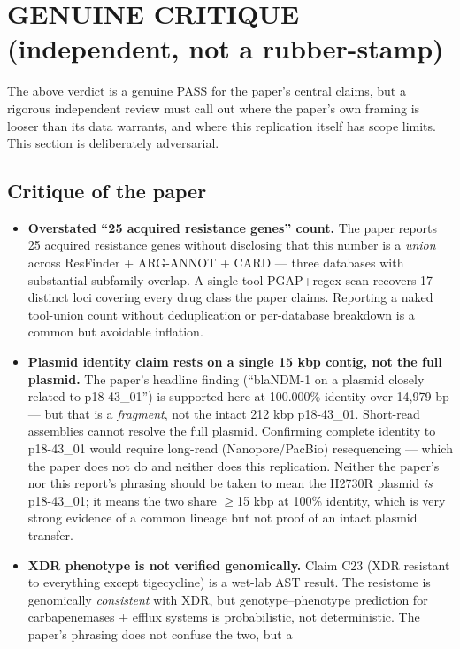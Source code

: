 \documentclass[11pt]{article}
\begin{document}
\section{GENUINE CRITIQUE (independent, not a rubber-stamp)}

The above verdict is a genuine PASS for the paper's central claims, but a rigorous independent
review must call out where the paper's own framing is looser than its data warrants, and where
this replication itself has scope limits. This section is deliberately adversarial.

\subsection*{Critique of the paper}
\begin{itemize}
\item \textbf{Overstated ``25 acquired resistance genes'' count.} The paper reports 25 acquired
      resistance genes without disclosing that this number is a \emph{union} across ResFinder +
      ARG-ANNOT + CARD --- three databases with substantial subfamily overlap. A single-tool
      PGAP+regex scan recovers 17 distinct loci covering every drug class the paper claims.
      Reporting a naked tool-union count without deduplication or per-database breakdown is a
      common but avoidable inflation.
\item \textbf{Plasmid identity claim rests on a single 15 kbp contig, not the full plasmid.}
      The paper's headline finding (``blaNDM-1 on a plasmid closely related to p18-43\_01'') is
      supported here at 100.000\% identity over 14{,}979 bp --- but that is a \emph{fragment}, not
      the intact 212 kbp p18-43\_01. Short-read assemblies cannot resolve the full plasmid.
      Confirming complete identity to p18-43\_01 would require long-read (Nanopore/PacBio)
      resequencing --- which the paper does not do and neither does this replication. Neither the
      paper's nor this report's phrasing should be taken to mean the H2730R plasmid \emph{is}
      p18-43\_01; it means the two share $\geq$15 kbp at 100\% identity, which is very strong
      evidence of a common lineage but not proof of an intact plasmid transfer.
\item \textbf{XDR phenotype is not verified genomically.} Claim C23 (XDR resistant to everything
      except tigecycline) is a wet-lab AST result. The resistome is genomically \emph{consistent}
      with XDR, but genotype--phenotype prediction for carbapenemases + efflux systems is
      probabilistic, not deterministic. The paper's phrasing does not confuse the two, but a

\end{itemize}
\end{document}
